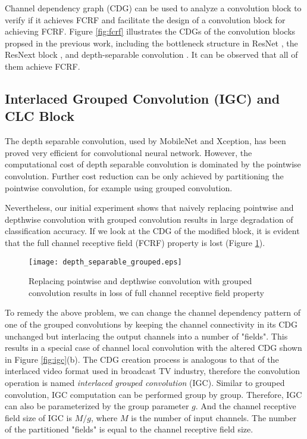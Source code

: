 \documentclass[10pt,twocolumn,letterpaper]{article}
\begin{document}
Channel dependency graph (CDG) can be used to analyze a convolution block to verify if it achieves FCRF and facilitate the design of a convolution block for achieving FCRF.  Figure \ref{fig:fcrf} illustrates the CDGs of the convolution blocks propsed in the previous work, including the bottleneck structure in ResNet \cite{resnet2016he},  the ResNext block \cite{resnext2016saining}, and depth-separable convolution \cite{mobilenet2017howard}. It can be observed that all of them achieve FCRF.

\subsection{Interlaced Grouped Convolution (IGC) and CLC Block}

The depth separable convolution, used by MobileNet\cite{mobilenet2017howard} and Xception\cite{xception2017chollet}, has been proved very efficient for convolutional neural network. However, the computational cost of depth separable convolution is dominated by the pointwise convolution. Further cost reduction can be only achieved by partitioning the pointwise convolution, for example using grouped convolution.

Nevertheless, our initial experiment shows that naively replacing pointwise and depthwise convolution with grouped convolution results in large degradation of classification accuracy. If we look at the CDG of the modified block, it is evident that the full channel receptive field (FCRF) property is lost (Figure \ref{fig:lost_FCRF}).

\begin{figure}[t!]
\begin{center}
\texttt{[image: depth\_separable\_grouped.eps]}
\end{center}
   \caption{Replacing pointwise and depthwise convolution with grouped convolution results in loss of full channel receptive field property}
\label{fig:lost_FCRF}
\end{figure}

To remedy the above problem, we can change the channel dependency pattern of one of the grouped convolutions by keeping the channel connectivity in its CDG unchanged but interlacing the output channels into a number of "fields". This results in a special case of channel local convolution with the altered CDG shown in Figure \ref{fig:igc}(b). The CDG creation process is analogous to that of the interlaced video format used in broadcast TV industry, therefore the convolution operation is named \textit{interlaced grouped convolution} (IGC). Similar to grouped convolution, IGC computation can be performed group by group. Therefore, IGC can also be parameterized by the group parameter $g$. And the channel receptive field size of IGC is $M/g$, where $M$ is the number of input channels. The number of the partitioned "fields" is equal to the channel receptive field size. 
\end{document}
